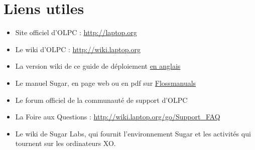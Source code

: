 \documentclass[11pt]{article}
\begin{document}
\section{Liens utiles}
\label{sec-12}


\begin{itemize}
\item Site officiel d'OLPC : \href{http://laptop.org}{http://laptop.org}
\item Le wiki d'OLPC : \href{http://wiki.laptop.org}{http://wiki.laptop.org}
\item La version wiki de ce guide de déploiement \href{http://wiki.laptop.org/go/Deployment_Guide}{en anglais}
\item Le manuel Sugar, en page web ou en pdf sur \href{http://en.flossmanuals.net/Sugar}{Flossmanuals}
\item Le forum officiel de la communauté de support d'OLPC
\item La Foire aux Questions : \href{http://wiki.laptop.org/go/Support_FAQ}{http://wiki.laptop.org/go/Support\_FAQ}
\item Le wiki de Sugar Labs, qui fournit l'environnement Sugar et les activités
  qui tournent sur les ordinateurs XO.
\end{itemize}
\end{document}
